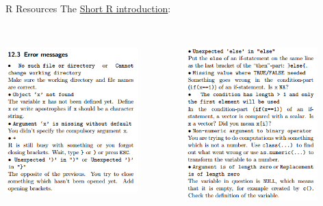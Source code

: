 \documentclass[xcolor=svgnames]{beamer}\usepackage[]{graphicx}\usepackage[]{color}
\begin{document}
\begin{frame}[t]{R Resources}
The \href{http://cran.r-project.org/doc/contrib/Torfs+Brauer-Short-R-Intro.pdf}{Short R introduction}:\\~\\
\begin{columns}[T]
\begin{column}{0.5\textwidth}
\centerline{\includegraphics[width = 0.8\textwidth]{err1.png}}
\end{column}
\begin{column}{0.5\textwidth}
\centerline{\includegraphics[width = 0.8\textwidth]{err2.png}}
\end{column}
\end{columns}
\end{frame}
\end{document}
